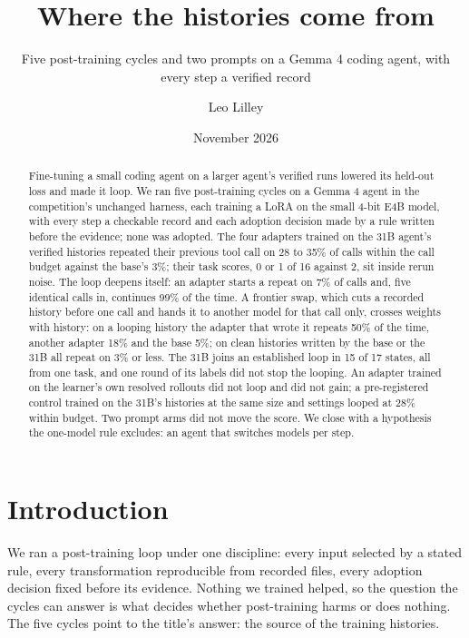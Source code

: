 \documentclass[
  11pt,
  a4paper,
]{article}
\title{Where the histories come from}
\subtitle{Five post-training cycles and two prompts on a Gemma 4 coding
agent, with every step a verified record}
\author{Leo Lilley}
\date{November 2026}
\begin{document}
\maketitle
\begin{abstract}
Fine-tuning a small coding agent on a larger agent's verified runs
lowered its held-out loss and made it loop. We ran five post-training
cycles on a Gemma 4 agent in the competition's unchanged harness, each
training a LoRA on the small 4-bit E4B model, with every step a
checkable record and each adoption decision made by a rule written
before the evidence; none was adopted. The four adapters trained on the
31B agent's verified histories repeated their previous tool call on 28
to 35\% of calls within the call budget against the base's 3\%; their
task scores, 0 or 1 of 16 against 2, sit inside rerun noise. The loop
deepens itself: an adapter starts a repeat on 7\% of calls and, five
identical calls in, continues 99\% of the time. A frontier swap, which
cuts a recorded history before one call and hands it to another model
for that call only, crosses weights with history: on a looping history
the adapter that wrote it repeats 50\% of the time, another adapter 18\%
and the base 5\%; on clean histories written by the base or the 31B all
repeat on 3\% or less. The 31B joins an established loop in 15 of 17
states, all from one task, and one round of its labels did not stop the
looping. An adapter trained on the learner's own resolved rollouts did
not loop and did not gain; a pre-registered control trained on the 31B's
histories at the same size and settings looped at 28\% within budget.
Two prompt arms did not move the score. We close with a hypothesis the
one-model rule excludes: an agent that switches models per step.
\end{abstract}

\section{Introduction}\label{introduction}

We ran a post-training loop under one discipline: every input selected
by a stated rule, every transformation reproducible from recorded files,
every adoption decision fixed before its evidence. Nothing we trained
helped, so the question the cycles can answer is what decides whether
post-training harms or does nothing. The five cycles point to the
title's answer: the source of the training histories.
\end{document}
